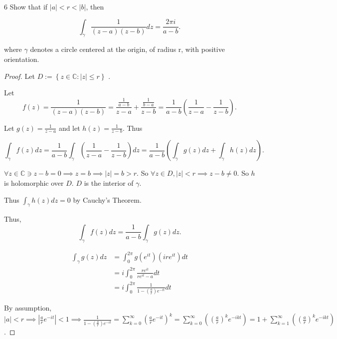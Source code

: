 \documentclass{article}
\newcommand{\C}{\mathbb{C}}
\begin{document}
\bigskip

\begin{PROB}{6}\label{Problem 6.}
    Show that if $|a| < r < |b|$, then
    
    \[\int_{\gamma}^{} \frac{1}{(z - a)(z - b)} dz = \frac{2\pi i}{a -b}.\]

    where $\gamma$ denotes a circle centered at the origin, of radius r, with positive orientation.
\end{PROB}
\begin{proof}

    Let $D := \left\{ z \in \C : |z| \leq r \right\}$ .

    Let
    \begin{equation}
        f(z) = \frac{1}{(z - a)(z - b)} = \frac{\frac{1}{a - b}}{z - a} + \frac{\frac{1}{b - a}}{z - b} = \frac{1}{a - b}\left( \frac{1}{z - a} - \frac{1}{z - b} \right).
    \end{equation}

    Let $g(z) = \frac{1}{z - a}$ and let $h(z) =\frac{1}{z - b}$. 
    Thus 

    \[
        \int_{\gamma}^{} f(z) dz = \frac{1}{a - b} \int_{\gamma}^{} \left(\frac{1}{z - a} - \frac{1}{z - b}\right) dz = \frac{1}{a - b} \left( \int_{\gamma}^{} g(z) dz + \int_{\gamma}^{} h(z) dz \right).
    \]

    $\forall z \in \C \ni z - b = 0 \implies z = b \implies |z| = b > r$. So $\forall z \in D, |z| < r \implies z - b \neq 0$. So $h$ is holomorphic over $D$. $D$ is the interior of $\gamma$.   
    
    Thus $\int_{\gamma}^{} h(z) dz = 0$ by Cauchy's Theorem. 
    
    Thus, \[\int_{\gamma}^{} f(z) dz = \frac{1}{a - b} \int_{\gamma}^{} g(z) dz. \]

    \begin{align*}
        \int_{\gamma}^{} g(z) dz &= \int_{0}^{2\pi} g(e^{it})(ire^{it}) dt \\
        &= i \int_{0}^{2\pi} \frac{re^{it}}{re^{it} - a} dt \\
        &= i \int_{0}^{2\pi} \frac{1}{1 - \left(\frac{a}{r} \right)e^{-it}} dt
    \end{align*}

    By assumption, $|a| < r \implies |\frac{a}{r}e^{-it}| < 1 \implies \frac{1}{1 - \left(\frac{a}{r} \right)e^{-it}}= \sum_{k = 0}^{\infty} (\frac{a}{r}e^{-it})^k = \sum_{k = 0}^{\infty} \left(\left(\frac{a}{r}\right)^ke^{-ikt}\right) = 1 + \sum_{k = 1}^{\infty} \left(\left(\frac{a}{r}\right)^ke^{-ikt}\right)$. 
    

\end{proof}
\end{document}
